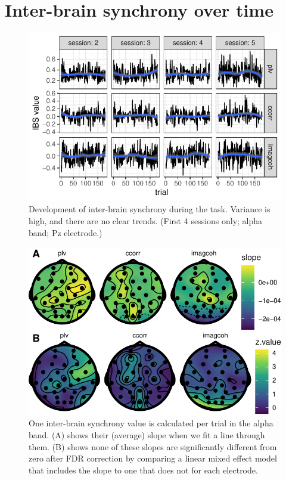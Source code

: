
\section{Inter-brain synchrony over time}
\label{sec:timecourse}

\begin{figure}[!htpb]
  \includegraphics[width=\linewidth]{../stats/results/timecourse_repr.pdf}
  \caption{Development of inter-brain synchrony during the task. Variance is high, and there are no clear trends. (First 4 sessions only; alpha band; Pz electrode.)}
  \label{fig:timecourse_repr}
\end{figure}

\begin{figure}[!htpb]
  \includegraphics[width=\linewidth]{../stats/results/slopes_alpha.pdf}
  \caption{One inter-brain synchrony value is calculated per trial in the alpha band. (A) shows their (average) slope when we fit a line through them. (B) shows none of these slopes are significantly different from zero after FDR correction by comparing a linear mixed effect model that includes the slope to one that does not for each electrode.}
  \label{fig:slopes_alpha}
\end{figure}

